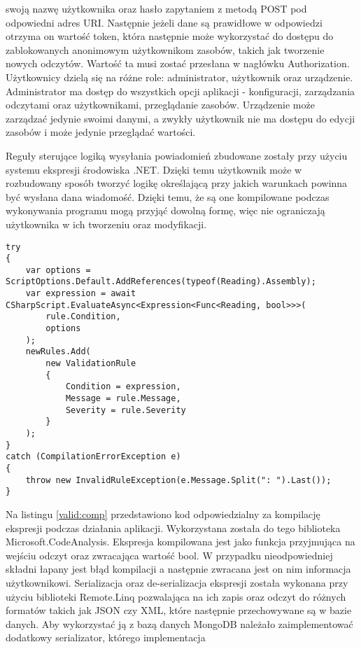 swoją nazwę użytkownika oraz hasło zapytaniem z metodą POST pod odpowiedni adres
URI. Następnie jeżeli dane są prawidłowe w odpowiedzi otrzyma on wartość
token, która następnie może wykorzystać do dostępu do zablokowanych anonimowym
użytkownikom zasobów, takich jak tworzenie nowych odczytów. Wartość
ta musi zostać przesłana w nagłówku Authorization.
Użytkownicy dzielą się na różne role: administrator, użytkownik oraz urządzenie.
Administrator ma dostęp do wszystkich opcji aplikacji - konfiguracji, zarządzania odczytami
oraz użytkownikami, przeglądanie zasobów. Urządzenie może zarządzać jedynie swoimi
danymi, a zwykły użytkownik nie ma dostępu do edycji zasobów i może jedynie przeglądać
wartości.

Reguły sterujące logiką wysyłania powiadomień zbudowane zostały przy użyciu systemu
ekspresji środowiska .NET. Dzięki temu użytkownik może w rozbudowany sposób
tworzyć logikę określającą przy jakich warunkach powinna być wysłana dana wiadomość.
Dzięki temu, że są one kompilowane podczas wykonywania programu mogą przyjąć dowolną
formę, więc nie ograniczają użytkownika w ich tworzeniu oraz modyfikacji.
\begin{lstlisting}[language={[Sharp]C},caption={Kompilacja formy tekstowej ekspresji},label={valid:comp},captionpos=b]
try
{
    var options = ScriptOptions.Default.AddReferences(typeof(Reading).Assembly);
    var expression = await CSharpScript.EvaluateAsync<Expression<Func<Reading, bool>>>(
        rule.Condition,
        options
    );
    newRules.Add(
        new ValidationRule
        {
            Condition = expression,
            Message = rule.Message,
            Severity = rule.Severity
        }
    );
}
catch (CompilationErrorException e)
{
    throw new InvalidRuleException(e.Message.Split(": ").Last());
}
\end{lstlisting}
Na listingu \ref{valid:comp} przedstawiono kod odpowiedzialny za kompilację ekspresji podczas działania
aplikacji. Wykorzystana została do tego biblioteka Microsoft.CodeAnalysis. Ekspresja kompilowana jest
jako funkcja przyjmująca na wejściu odczyt oraz zwracająca wartość bool. W przypadku nieodpowiedniej składni
łapany jest błąd kompilacji a następnie zwracana jest on nim informacja użytkownikowi.
Serializacja oraz de-serializacja ekspresji została wykonana przy użyciu biblioteki
Remote.Linq pozwalająca na ich zapis oraz odczyt do różnych formatów takich jak
JSON czy XML, które następnie przechowywane są w bazie danych. Aby wykorzystać ją
z bazą danych MongoDB należało zaimplementować dodatkowy serializator, którego implementacja
